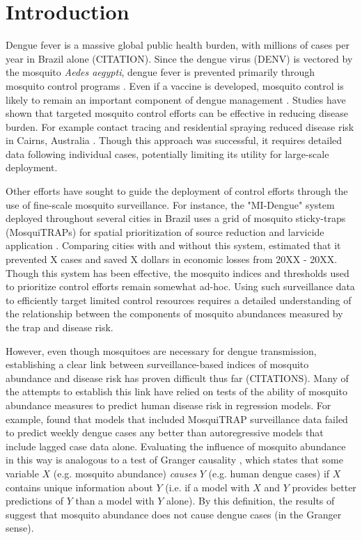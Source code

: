 \documentclass[10pt,letterpaper]{article}
\begin{document}
\linenumbers

\section*{Introduction}

Dengue fever is a massive global public health burden, with millions of cases per year in Brazil alone (CITATION).  
Since the dengue virus (DENV) is vectored by the mosquito \textit{Aedes aegypti}, dengue fever is prevented primarily through mosquito control programs \cite{Achee2015}.
Even if a vaccine is developed, mosquito control is likely to remain an important component of dengue management \cite{Achee2015}.
Studies have shown that targeted mosquito control efforts can be effective in reducing disease burden.
For example contact tracing and residential spraying reduced disease risk in Cairns, Australia \cite{Vazquez-Prokopec2017}.
Though this approach was successful, it requires detailed data following individual cases, potentially limiting its utility for large-scale deployment.

Other efforts have sought to guide the deployment of control efforts through the use of fine-scale mosquito surveillance.
For instance, the "MI-Dengue" system deployed throughout several cities in Brazil uses a grid of mosquito sticky-traps (MosquiTRAPs) for spatial prioritization of source reduction and larvicide application \cite{Eiras2009}.
Comparing cities with and without this system, \cite{Pepin2013} estimated that it prevented X cases and saved X dollars in economic losses from 20XX - 20XX.
Though this system has been effective, the mosquito indices and thresholds used to prioritize control efforts remain somewhat ad-hoc.
Using such surveillance data to efficiently target limited control resources requires a detailed understanding of the relationship between the components of mosquito abundances measured by the trap and disease risk.

However, even though mosquitoes are necessary for dengue transmission, establishing a clear link between surveillance-based indices of mosquito abundance and disease risk has proven difficult thus far (CITATIONS).
Many of the attempts to establish this link have relied on tests of the ability of mosquito abundance measures to predict human disease risk in regression models.
For example, \cite{Pepin2015} found that models that included MosquiTRAP surveillance data failed to predict weekly dengue cases any better than autoregressive models that include lagged case data alone.
Evaluating the influence of mosquito abundance in this way is analogous to a test of Granger causality \cite{Granger1969}, which states that some variable $X$ (e.g. mosquito abundance) \emph{causes} $Y$ (e.g. human dengue cases) if $X$ contains unique information about $Y$ (i.e. if a model with $X$ and $Y$ provides better predictions of $Y$ than a model with $Y$ alone).
By this definition, the results of \cite{Pepin2015} suggest that mosquito abundance does not cause dengue cases (in the Granger sense).
\end{document}
